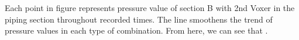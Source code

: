 Each point in figure represents pressure value of section B with 2nd Voxer in the piping section throughout recorded times. The line smoothens the trend of pressure values in each type of combination. From here, we can see that .


\clearpage %

